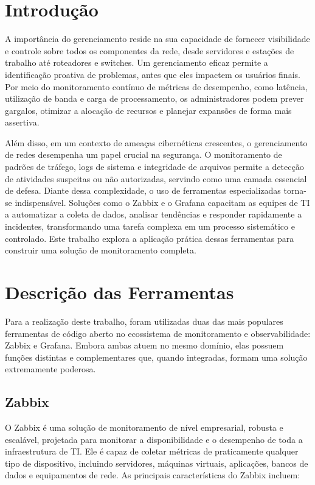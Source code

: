 \chapter{Introdução}
A importância do gerenciamento reside na sua capacidade de fornecer visibilidade e controle sobre todos os componentes da rede, desde servidores e estações de trabalho até roteadores e switches. Um gerenciamento eficaz permite a identificação proativa de problemas, antes que eles impactem os usuários finais. Por meio do monitoramento contínuo de métricas de desempenho, como latência, utilização de banda e carga de processamento, os administradores podem prever gargalos, otimizar a alocação de recursos e planejar expansões de forma mais assertiva.

Além disso, em um contexto de ameaças cibernéticas crescentes, o gerenciamento de redes desempenha um papel crucial na segurança. O monitoramento de padrões de tráfego, logs de sistema e integridade de arquivos permite a detecção de atividades suspeitas ou não autorizadas, servindo como uma camada essencial de defesa. Diante dessa complexidade, o uso de ferramentas especializadas torna-se indispensável. Soluções como o Zabbix e o Grafana capacitam as equipes de TI a automatizar a coleta de dados, analisar tendências e responder rapidamente a incidentes, transformando uma tarefa complexa em um processo sistemático e controlado. Este trabalho explora a aplicação prática dessas ferramentas para construir uma solução de monitoramento completa.

\chapter{Descrição das Ferramentas}
Para a realização deste trabalho, foram utilizadas duas das mais populares ferramentas de código aberto no ecossistema de monitoramento e observabilidade: Zabbix e Grafana. Embora ambas atuem no mesmo domínio, elas possuem funções distintas e complementares que, quando integradas, formam uma solução extremamente poderosa.

\section{Zabbix}
O Zabbix é uma solução de monitoramento de nível empresarial, robusta e escalável, projetada para monitorar a disponibilidade e o desempenho de toda a infraestrutura de TI. Ele é capaz de coletar métricas de praticamente qualquer tipo de dispositivo, incluindo servidores, máquinas virtuais, aplicações, bancos de dados e equipamentos de rede. As principais características do Zabbix incluem:

